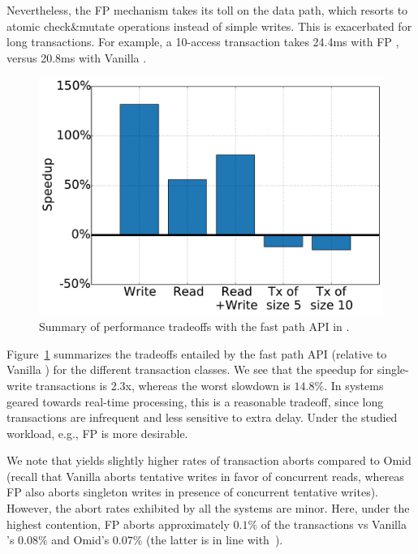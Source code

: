Nevertheless,
the FP mechanism takes its toll on the data path, which resorts to atomic check\&mutate operations 
instead of simple writes. This is exacerbated for long transactions. 
For example, a 10-access transaction takes 24.4ms with FP \sys, 
versus 20.8ms with Vanilla \sys. 

\begin{figure}[h!]
\centering
\includegraphics[width=.48\textwidth]{figs/speedup.pdf}
\caption{Summary of performance tradeoffs with the fast path API in {\sys}.}
\label{fig:fp-tradeoff}
\end{figure}

Figure~\ref{fig:fp-tradeoff} summarizes the tradeoffs entailed by the fast path API
(relative to Vanilla \sys) for the different transaction classes. 
We see that the speedup for single-write transactions is 2.3x, whereas the worst slowdown is $14.8\%$. 
In systems geared towards real-time processing, this is a reasonable tradeoff, since long transactions 
are infrequent and less sensitive to extra delay. Under the studied workload, e.g.,   FP \sys\/ is more desirable. 

We note that \sys\/ yields slightly higher rates of transaction aborts compared to Omid (recall 
that Vanilla \sys\/ aborts tentative writes in favor of concurrent reads, whereas FP \sys\/ also aborts
singleton writes in presence of concurrent tentative writes). However, the abort rates exhibited by all  
the systems are minor. Here, under the highest contention, FP \sys\/ aborts approximately $0.1\%$ 
of the transactions vs Vanilla \sys's $0.08\%$ and Omid's $0.07\%$ (the latter  is in line 
with~\cite{Omid2017}).  


